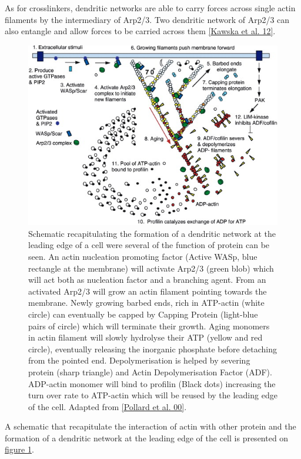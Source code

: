 \documentclass[A4paperpaper,11pt,english]{sphinxmanual}
\begin{document}
As for crosslinkers, dendritic networks are able to carry forces across single
actin filaments by the intermediary of Arp2/3. Two dendritic network of Arp2/3
can also entangle and allow forces to be carried across them
{\hyperref[index-latex:kawska2012]{{[}Kawska et al. 12{]}}}.
\begin{figure}[htbp]
\centering
\capstart

\includegraphics[width=0.700\linewidth]{pollard2003-actin-cycle.jpg}
\caption{Schematic recapitulating the formation of
a dendritic network at the leading edge of a cell were several of the
function of protein can be seen. An actin nucleation promoting factor
(Active WASp,  blue rectangle at the membrane) will activate Arp2/3 (green
blob) which will act both as nucleation factor and a branching agent. From
an activated Arp2/3 will grow an actin filament pointing towards the
membrane. Newly growing barbed ends, rich in ATP-actin (white circle) can
eventually be capped by Capping Protein (light-blue pairs of circle) which
will terminate their growth.  Aging monomers in actin filament will slowly
hydrolyse their ATP (yellow and red circle), eventually releasing the
inorganic phosphate before detaching from the pointed end.
Depolymerisation is helped by severing protein (sharp triangle) and Actin
Depolymerisation Factor (ADF). ADP-actin monomer will bind to profilin
(Black dots) increasing the turn over rate to ATP-actin which will be reused
by the leading edge of the cell. Adapted from {\hyperref[index-latex:pollard2000]{{[}Pollard et al. 00{]}}}.}\label{index-latex:actin-cycle}\end{figure}

A schematic that recapitulate the interaction of actin with other protein and
the formation of a dendritic network at the leading edge of the cell is
presented on \hyperref[index-latex:actin-cycle]{figure  \ref*{index-latex:actin-cycle}}.
\end{document}
